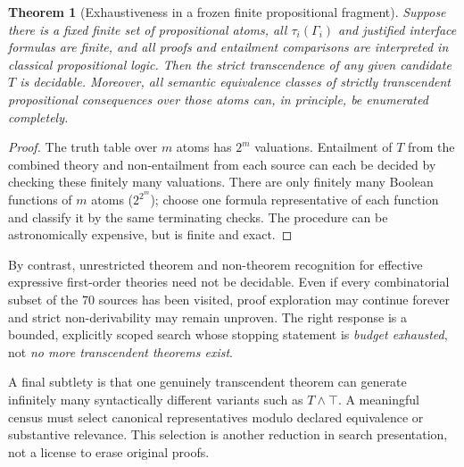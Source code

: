 \documentclass[11pt,letterpaper]{article}
\newtheorem{theorem}{Theorem}[section]
\begin{document}
\begin{theorem}[Exhaustiveness in a frozen finite propositional fragment]
Suppose there is a fixed finite set of propositional atoms, all $\tau_i(\Gamma_i)$ and justified interface formulas are finite, and all proofs and entailment comparisons are interpreted in classical propositional logic. Then the strict transcendence of any given candidate $T$ is decidable. Moreover, all \emph{semantic equivalence classes} of strictly transcendent propositional consequences over those atoms can, in principle, be enumerated completely.
\end{theorem}
\begin{proof}
The truth table over $m$ atoms has $2^m$ valuations. Entailment of $T$ from the combined theory and non-entailment from each source can each be decided by checking these finitely many valuations. There are only finitely many Boolean functions of $m$ atoms ($2^{2^m}$); choose one formula representative of each function and classify it by the same terminating checks. The procedure can be astronomically expensive, but is finite and exact.
\end{proof}

By contrast, unrestricted theorem and non-theorem recognition for effective expressive first-order theories need not be decidable. Even if every combinatorial subset of the 70 sources has been visited, proof exploration may continue forever and strict non-derivability may remain unproven. The right response is a bounded, explicitly scoped search whose stopping statement is \emph{budget exhausted}, not \emph{no more transcendent theorems exist}.

A final subtlety is that one genuinely transcendent theorem can generate infinitely many syntactically different variants such as $T\wedge\top$. A meaningful census must select canonical representatives modulo declared equivalence or substantive relevance. This selection is another reduction in search presentation, not a license to erase original proofs.
\end{document}
